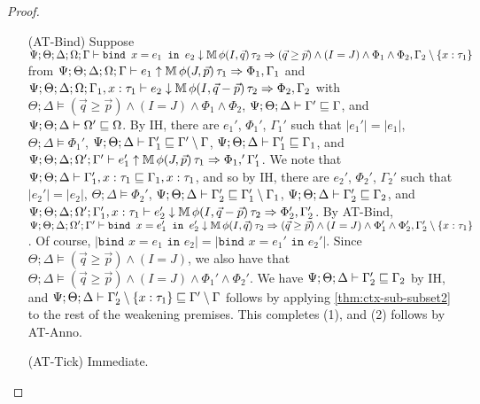 \begin{proof}
\begin{itemize}
  \item[(AT-Bind)] Suppose
  $\Psi ; \Theta ; \Delta ; \Omega ; \Gamma \vdash \texttt{bind } x = e_1 \texttt{ in } e_2 \downarrow \mathbb{M} \, \phi(I,\vec{q})\, \tau_2 \Rightarrow (\vec{q} \geq \vec{p}) \wedge (I =J)  \wedge \Phi_1 \wedge \Phi_2, \Gamma_2 \setminus \{x : \tau_1\}$ from
  $\Psi ; \Theta ; \Delta ; \Omega ; \Gamma \vdash e_1 \uparrow \mathbb{M} \, \phi(J,\vec{p})\, \tau_1 \Rightarrow \Phi_1,\Gamma_1$ and
  $\Psi ; \Theta; \Delta ; \Omega ; \Gamma_1, x:\tau_1 \vdash e_2 \downarrow \mathbb{M} \, \phi(I,\vec{q} - \vec{p})\, \tau_2 \Rightarrow \Phi_2,\Gamma_2$ with
  $\Theta ; \Delta \vDash (\vec{q} \geq \vec{p}) \wedge (I =J)  \wedge \Phi_1 \wedge \Phi_2$,
  $\Psi ; \Theta ; \Delta \vdash \Gamma' \sqsubseteq \Gamma$, and
  $\Psi ; \Theta ; \Delta \vdash \Omega' \sqsubseteq \Omega$.
  By IH, there are $e_1'$, $\Phi_1'$, $\Gamma_1'$ such that
  $|e_1'| = |e_1|$,
  $\Theta ; \Delta \vDash \Phi_1'$,
  $\Psi ; \Theta ; \Delta \vdash \Gamma_1' \sqsubseteq \Gamma' \setminus \Gamma$,
  $\Psi ; \Theta ; \Delta \vdash \Gamma_1' \sqsubseteq \Gamma_1$, and
  $\Psi ; \Theta ; \Delta ; \Omega' ; \Gamma' \vdash e_1' \uparrow \mathbb{M} \, \phi(J,\vec{p}) \, \tau_1 \Rightarrow \Phi_1,'\Gamma_1'$.
  We note that $\Psi ; \Theta ; \Delta \vdash \Gamma_1',x:\tau_1 \sqsubseteq \Gamma_1, x: \tau_1$, and so
  by IH, there are $e_2'$, $\Phi_2'$, $\Gamma_2'$ such that
  $|e_2'| = |e_2|$,
  $\Theta ; \Delta \vDash \Phi_2'$,
  $\Psi ; \Theta ; \Delta \vdash \Gamma_2' \sqsubseteq \Gamma_1' \setminus \Gamma_1$,
  $\Psi ; \Theta ; \Delta \vdash \Gamma_2' \sqsubseteq \Gamma_2$, and
  $\Psi ; \Theta; \Delta ; \Omega' ; \Gamma_1', x:\tau_1 \vdash e_2' \downarrow \mathbb{M} \, \phi(I,\vec{q} - \vec{p})\, \tau_2 \Rightarrow \Phi_2',\Gamma_2'$.
  By AT-Bind,
  $\Psi ; \Theta ; \Delta ; \Omega' ; \Gamma' \vdash \texttt{bind } x = e_1' \texttt{ in } e_2' \downarrow \mathbb{M} \, \phi(I,\vec{q})\, \tau_2 \Rightarrow (\vec{q} \geq \vec{p}) \wedge (I =J)  \wedge \Phi_1' \wedge \Phi_2', \Gamma_2' \setminus \{x : \tau_1\}$.
  Of course, $|\texttt{bind } x = e_1 \texttt{ in } e_2| = |\texttt{bind } x = e_1' \texttt{ in } e_2'|$.
  Since $\Theta ; \Delta \vDash (\vec{q} \geq \vec{p}) \wedge (I=J)$, we also have that $\Theta ; \Delta \vDash (\vec{q} \geq \vec{p}) \wedge (I =J)  \wedge \Phi_1' \wedge \Phi_2'$.
  We have $\Psi ; \Theta ; \Delta \vdash \Gamma_2' \sqsubseteq \Gamma_2$  by IH, and
  $\Psi ; \Theta ; \Delta \vdash \Gamma_2' \setminus \{x : \tau_1\} \sqsubseteq \Gamma' \setminus \Gamma$ follows by applying \autoref{thm:ctx-sub-subset2} to the rest of the weakening premises. This completes (1), and (2) follows by AT-Anno.
  
  \item[(AT-Tick)] Immediate.
  

\end{itemize}
\end{proof}
